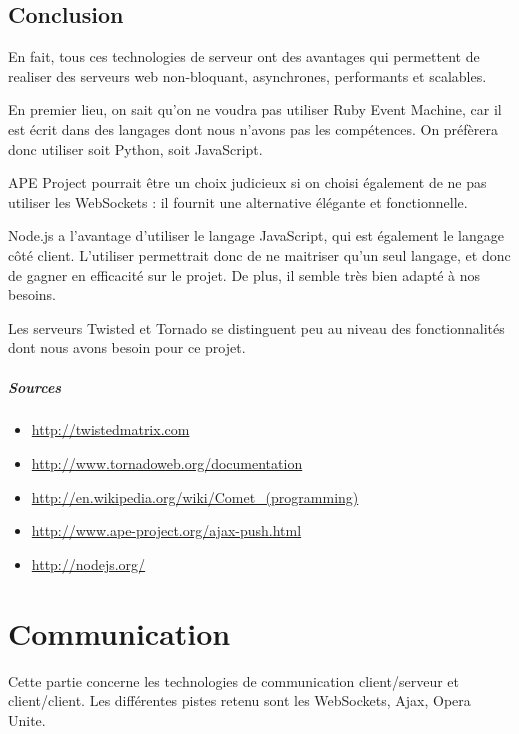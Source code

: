 \documentclass[a4paper,10pt]{report}
\begin{document}
  \section{Conclusion}

En fait, tous ces technologies de serveur ont des avantages qui permettent de realiser des serveurs web non-bloquant, asynchrones, performants et scalables. 

En premier lieu, on sait qu'on ne voudra pas utiliser Ruby Event Machine, car il est écrit dans des langages dont nous n'avons pas les compétences. On préfèrera donc utiliser soit Python, soit JavaScript. 

APE Project pourrait être un choix judicieux si on choisi également de ne pas utiliser les WebSockets : il fournit une alternative élégante et fonctionnelle. 

Node.js a l'avantage d'utiliser le langage JavaScript, qui est également le langage côté client. L'utiliser permettrait donc de ne maitriser qu'un seul langage, et donc de gagner en efficacité sur le projet. De plus, il semble très bien adapté à nos besoins. 

Les serveurs Twisted et Tornado se distinguent peu au niveau des fonctionnalités dont nous avons besoin pour ce projet. 



  \paragraph{Sources}

    \begin{itemize}
    \item \url{http://twistedmatrix.com}
    \item \url{http://www.tornadoweb.org/documentation}
    \item \url{http://en.wikipedia.org/wiki/Comet_(programming)}
    \item \url{http://www.ape-project.org/ajax-push.html}
    \item \url{http://nodejs.org/}
    \end{itemize}




\chapter{Communication}

Cette partie concerne les technologies de communication client/serveur et 
client/client. Les différentes pistes retenu sont les WebSockets, Ajax, 
Opera Unite.
\end{document}
